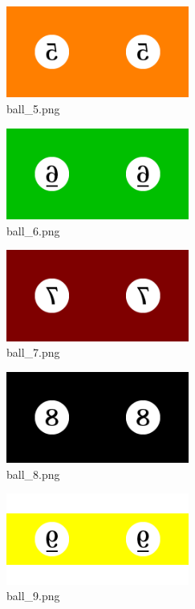 \documentclass[a4j,titlepage]{jsarticle}
\begin{document}
\begin{figure}[H]
  \centering
  \includegraphics[width=6cm]{../images/ball_5.png}
  \caption{ball\_5.png}
  \label{fig:ball_5}
\end{figure}

\begin{figure}[H]
  \centering
  \includegraphics[width=6cm]{../images/ball_6.png}
  \caption{ball\_6.png}
  \label{fig:ball_6}
\end{figure}

\begin{figure}[H]
  \centering
  \includegraphics[width=6cm]{../images/ball_7.png}
  \caption{ball\_7.png}
  \label{fig:ball_7}
\end{figure}

\begin{figure}[H]
  \centering
  \includegraphics[width=6cm]{../images/ball_8.png}
  \caption{ball\_8.png}
  \label{fig:ball_8}
\end{figure}

\begin{figure}[H]
  \centering
  \includegraphics[width=6cm]{../images/ball_9.png}
  \caption{ball\_9.png}
  \label{fig:ball_9}
\end{figure}
\end{document}

